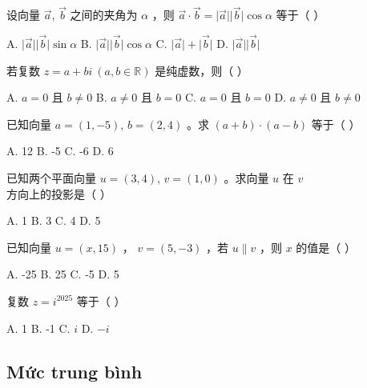 \documentclass[11pt, a4paper]{article}
\begin{document}
\begin{baitap}[1]
设向量 $\vec{a}$, $\vec{b}$ 之间的夹角为 $\alpha$ ，则 $\vec{a} \cdot \vec{b} = \lvert\vec{a}\rvert\lvert\vec{b}\rvert\cos\alpha$ 等于（ ）
\par\vspace{3pt}
\noindent A. $\lvert\vec{a}\rvert\lvert\vec{b}\rvert\sin\alpha$ \quad B. $\lvert\vec{a}\rvert\lvert\vec{b}\rvert\cos\alpha$ \quad C. $\lvert\vec{a}\rvert + \lvert\vec{b}\rvert$ \quad D. $\lvert\vec{a}\rvert\lvert\vec{b}\rvert$
\end{baitap}
\begin{baitap}[2]
若复数 $z = a + bi\ (a, b \in \mathbb{R})$ 是纯虚数，则（ ）
\par\vspace{3pt}
\noindent A. $a = 0$ 且 $b \ne 0$ \quad B. $a \ne 0$ 且 $b = 0$ \quad C. $a = 0$ 且 $b = 0$ \quad D. $a \ne 0$ 且 $b \ne 0$
\end{baitap}
\begin{baitap}[3]
已知向量 $a = (1, -5)$, $b = (2,4)$ 。求 $(a + b) \cdot (a - b)$ 等于（ ）
\par\vspace{3pt}
\noindent A. 12 \quad B. -5 \quad C. -6 \quad D. 6
\end{baitap}
\begin{baitap}[4]
已知两个平面向量 $u = (3,4)$, $v = (1,0)$ 。求向量 $u$ 在 $v$ 方向上的投影是（ ）
\par\vspace{3pt}
\noindent A. 1 \quad B. 3 \quad C. 4 \quad D. 5
\end{baitap}
\begin{baitap}[5]
已知向量 $u = (x,15)$ ， $v = (5,-3)$ ，若 $u \parallel v$ ，则 $x$ 的值是（ ）
\par\vspace{3pt}
\noindent A. -25 \quad B. 25 \quad C. -5 \quad D. 5
\end{baitap}
\begin{baitap}[6]
复数 $z = i^{2025}$ 等于（ ）
\par\vspace{3pt}
\noindent A. 1 \quad B. -1 \quad C. $i$ \quad D. $-i$
\end{baitap}
\subsection{Mức trung bình}
\end{document}
